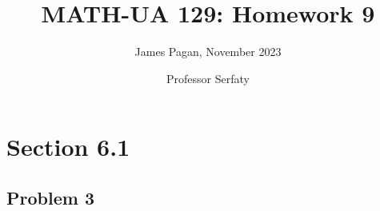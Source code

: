 \documentclass[11pt]{article}
\title{MATH-UA 129: Homework 9}
\author{James Pagan, November 2023}
\date{Professor Serfaty}
\begin{document}
\maketitle
\tableofcontents
\newpage


\section{Section 6.1}


\subsection*{Problem 3}
\end{document}
